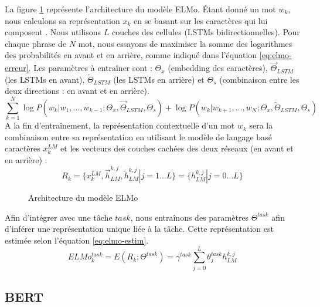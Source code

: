 \documentclass{KodeBook}
\begin{document}
La figure \ref{fig:elmo-arch} représente l'architecture du modèle ELMo. 
Étant donné un mot $w_k$, nous calculons sa représentation $x_k$ en se basant sur les caractères qui lui composent \cite{2015-kim-al}. 
Nous utilisons $L$ couches des cellules  (LSTMs bidirectionnelles). 
Pour chaque  phrase de $N$ mot, nous essayons de maximiser la somme des logarithmes des probabilités en avant et en arrière, comme indiqué dans l'équation \ref{eq:elmo-erreur}. 
Les paramètres à entraîner sont : $\Theta_x$ (embedding des caractères), $\overrightarrow{\Theta}_{LSTM}$ (les LSTMs en avant), $\overleftarrow{\Theta}_{LSTM}$ (les LSTMs en arrière) et $\Theta_s$ (combinaison entre les deux directions : en avant et en arrière).
\begin{equation}
\sum_{k=1}^{N} 
\log P(w_k | w_1,\ldots,w_{k-1}; \Theta_x, \overrightarrow{\Theta}_{LSTM}, \Theta_s)
+
\log P(w_k | w_{k+1},\ldots,w_{N}; \Theta_x, \overleftarrow{\Theta}_{LSTM}, \Theta_s)
\label{eq:elmo-erreur}
\end{equation}
A la fin d'entraînement, la représentation contextuelle d'un mot $w_k$ sera la combinaison entre sa représentation en utilisant le modèle de langage basé caractères $x_k^{LM}$ et les vecteurs des couches cachées des deux réseaux  (en avant et en arrière) : 
\[
R_k = \{x_k^{LM}, \overrightarrow{h}_{LM}^{k, j}, \overleftarrow{h}_{LM}^{k, j} | j= 1 \ldots L \}
= \{h_{LM}^{k, j} | j= 0 \ldots L \}
\]

\begin{figure}[ht]
	\centering
	\caption{Architecture du modèle ELMo}
	\label{fig:elmo-arch}
\end{figure}

Afin d'intégrer  avec une tâche  $task$, nous entraînons des paramètres $\Theta^{task}$ afin d'inférer une représentation unique liée à la tâche.
Cette représentation est estimée selon l'équation \ref{eq:elmo-estim}. 
\begin{equation}
ELMo_k^{task} = E(R_k; \Theta^{task}) = \gamma^{task} \sum_{j=0}^{L} \theta_j^{task} h_{LM}^{k, j}
\label{eq:elmo-estim}
\end{equation}

\subsection{BERT}
\end{document}
